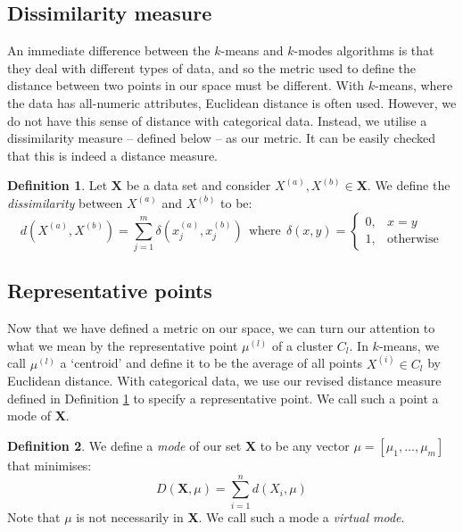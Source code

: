 \documentclass{article}
\theoremstyle{definition}
\newtheorem{definition}{Definition}[section]
\begin{document}
\subsection{Dissimilarity measure}\label{subsection:dissim}

An immediate difference between the $k$-means and $k$-modes algorithms is that 
they deal with different types of data, and so the metric used to define the 
distance between two points in our space must be different. With $k$-means, 
where the data has all-numeric attributes, Euclidean distance is often used. 
However, we do not have this sense of distance with categorical data. Instead, 
we utilise a dissimilarity measure -- defined below -- as our metric. It can be 
easily checked that this is indeed a distance measure. \\


\begin{definition}\label{def:dissim}
	Let $\textbf{X}$ be a data set and consider $X^{(a)}, X^{(b)} \in 
    \textbf{X}$. We define the \emph{dissimilarity} between $X^{(a)}$ and 
    $X^{(b)}$ to be:
	\[
	d(X^{(a)}, X^{(b)}) = \sum_{j=1}^{m} \delta(x_j^{(a)}, x_j^{(b)}) \ \ 
	\text{where} \ \ \delta(x, y) = \begin{cases}
                                    0, & x = y \\
					                1, & \text{otherwise}
					                \end{cases}
	\]
\end{definition}


\subsection{Representative points}\label{subsection:rep-points}

Now that we have defined a metric on our space, we can turn our attention to 
what we mean by the representative point $\mu^{(l)}$ of a cluster $C_l$. In 
$k$-means, we call $\mu^{(l)}$ a `centroid' and define it to be the average of 
all points $X^{(i)} \in C_l$ by Euclidean distance. With categorical data, we 
use our revised distance measure defined in Definition \ref{def:dissim} to 
specify a representative point. We call such a point a mode of \textbf{X}. \\

\begin{definition}\label{def:mode}
	We define a \emph{mode} of our set \textbf{X} to be any vector $\mu = 
	[\mu_1, \ldots, \mu_m]$ that minimises:
	\begin{equation}
		D(\textbf{X}, \mu) = \sum_{i=1}^{n} d(X_i, \mu)
	\end{equation}
	Note that $\mu$ is not necessarily in \textbf{X}. We call such a mode a 
    \emph{virtual mode}.
\end{definition}
\end{document}
